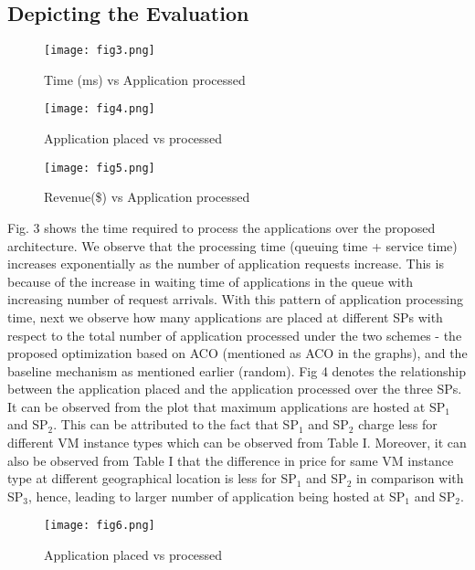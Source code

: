 \documentclass[12pt,a4paper,twoside,openright]{report}
\newcommand\tab[1][0.8cm]{\hspace*{#1}}
\begin{document}
\subsection{Depicting the Evaluation}
\begin{figure}[htbp]
	\centerline{\texttt{[image: fig3.png]}}
	\caption{Time (ms) vs Application processed}
	\label{fig}
\end{figure}
\begin{figure}[htbp]
	\centerline{\texttt{[image: fig4.png]}}
	\caption{Application placed vs processed}
	\label{fig}
\end{figure}
\begin{figure}[htbp]
	\centerline{\texttt{[image: fig5.png]}}
	\caption{Revenue(\$) vs Application processed}
	\label{fig}
\end{figure}
\tab Fig. 3 shows the time required to process the applications
over the proposed architecture. We observe that the processing
time (queuing time + service time) increases exponentially as
the number of application requests increase. This is because
of the increase in waiting time of applications in the queue
with increasing number of request arrivals. With this pattern
of application processing time, next we observe how many
applications are placed at different SPs with respect to the
total number of application processed under the two schemes
- the proposed optimization based on ACO (mentioned as
ACO in the graphs), and the baseline mechanism as mentioned
earlier (random). Fig 4 denotes the relationship between the
application placed and the application processed over the
three SPs. It can be observed from the plot that maximum
applications are hosted at SP$_1$ and SP$_2$. This can be attributed
to the fact that SP$_1$ and SP$_2$ charge less for different VM
instance types which can be observed from Table I. Moreover,
it can also be observed from Table I that the difference in price
for same VM instance type at different geographical location is
less for SP$_1$ and SP$_2$ in comparison with SP$_3$, hence, leading
to larger number of application being hosted at SP$_1$ and SP$_2$.


\begin{figure}[htbp]
	\centerline{\texttt{[image: fig6.png]}}
	\caption{Application placed vs processed}
	\label{fig}
\end{figure}




\end{document}
